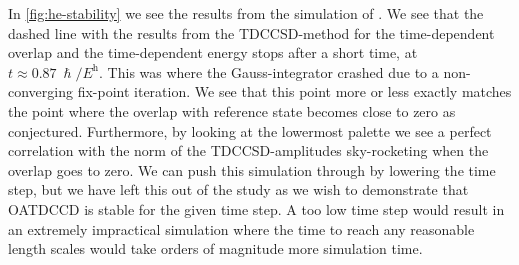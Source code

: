         In \autoref{fig:he-stability} we see the results from the
        simulation of .
        We see that the dashed line with the results from the TDCCSD-method for
        the time-dependent overlap and the time-dependent energy stops after a
        short time, at $t \approx \SI{0.87}{\hslash/\hartree}$.
        This was where the Gauss-integrator crashed due to a non-converging
        fix-point iteration.
        We see that this point more or less exactly matches the point where the
        overlap with reference state becomes close to zero as conjectured.
        Furthermore, by looking at the lowermost palette we see a perfect
        correlation with the norm of the TDCCSD-amplitudes sky-rocketing when
        the overlap goes to zero.
        We can push this simulation through by lowering the time step, but we have
        left this out of the study as we wish to demonstrate that OATDCCD is
        stable for the given time step.
        A too low time step would result in an extremely impractical simulation
        where the time to reach any reasonable length scales would take orders
        of magnitude more simulation time.
